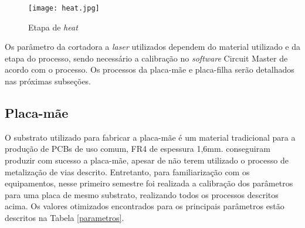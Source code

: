 \begin{enumerate}
\begin{figure}[htbp]
            \centering
            \label{rubout}
        \end{figure}
        
        \begin{figure}[htbp]
            \centering
            \caption{Etapa de \textit{heat}}
            \texttt{[image: heat.jpg]}
            
            \centering
            \label{heat}
        \end{figure}
    
    
\end{enumerate}

Os parâmetro da cortadora a \textit{laser} utilizados dependem do material utilizado e da etapa do processo, sendo necessário a calibração no \textit{software} Circuit Master de acordo com o processo. Os processos da placa-mãe e placa-filha serão detalhados nas próximas subseções.

\subsection{Placa-mãe}

O substrato utilizado para fabricar a placa-mãe é um material tradicional para a produção de PCBs de uso comum, FR4 de espessura 1,6mm. \citeauthor{TCC} conseguiram produzir com sucesso a placa-mãe, apesar de não terem utilizado o processo de metalização de vias descrito. Entretanto, para familiarização com os equipamentos, nesse primeiro semestre foi realizada a calibração dos parâmetros para uma placa de mesmo substrato, realizando todos os processos descritos acima. Os valores otimizados encontrados para os principais parâmetros estão descritos na Tabela \ref{parametros}.

